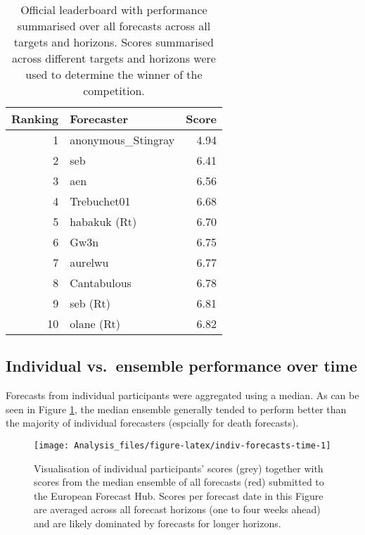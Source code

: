 \documentclass[
]{article}
\begin{document}
\begin{table}

\caption{\label{tab:leaderboard}Official leaderboard with performance summarised over all forecasts across all targets and horizons. Scores summarised across different targets and horizons were used to determine the winner of the competition.}
\centering
\begin{tabular}[t]{r|l|r}
\hline
Ranking & Forecaster & Score\\
\hline
1 & anonymous\_Stingray & 4.94\\
\hline
2 & seb & 6.41\\
\hline
3 & aen & 6.56\\
\hline
4 & Trebuchet01 & 6.68\\
\hline
5 & habakuk (Rt) & 6.70\\
\hline
6 & Gw3n & 6.75\\
\hline
7 & aurelwu & 6.77\\
\hline
8 & Cantabulous & 6.78\\
\hline
9 & seb (Rt) & 6.81\\
\hline
10 & olane (Rt) & 6.82\\
\hline
\end{tabular}
\end{table}

\hypertarget{individual-vs.-ensemble-performance-over-time}{%
\subsection{Individual vs.~ensemble performance over time}\label{individual-vs.-ensemble-performance-over-time}}

Forecasts from individual participants were aggregated using a median. As can be seen in Figure \ref{fig:indiv-forecasts-time}, the median ensemble generally tended to perform better than the majority of individual forecasters (espcially for death forecasts).

\begin{figure}
\texttt{[image: Analysis\_files/figure-latex/indiv-forecasts-time-1]} \caption{Visualisation of individual participants' scores (grey) together with scores from the median ensemble of all forecasts (red) submitted to the European Forecast Hub. Scores per forecast date in this Figure are averaged across all forecast horizons (one to four weeks ahead) and are likely dominated by forecasts for longer horizons.}\label{fig:indiv-forecasts-time}
\end{figure}
\end{document}
